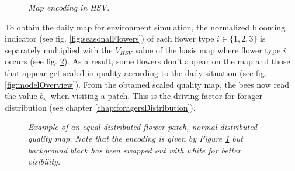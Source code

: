 	\begin{figure}[H]
		\centering
		\caption{\textit{Map encoding in HSV.}}
		\label{fig:hsvEncoding}
	\end{figure}
	
	To obtain the daily map for environment simulation, the normalized blooming indicator (see fig. \ref{fig:seasonalFlowers}) of each flower type $i \in \{1,2,3\}$ is separately multiplied with the $V_{HSV}$ value of the basis map where flower type $i$ occurs (see fig. \ref{fig:normeqMap}). As a result, some flowers don't appear on the map and those that appear get scaled in quality according to the daily situation (see fig. \ref{fig:modelOverview}). From the obtained scaled quality map, the bees now read the value $b_w$ when visiting a patch. This is the driving factor for forager distribution (see chapter \ref{chap:foragersDistribution}).
	
	\begin{figure}[H]
		\centering
		\caption{\textit{Example of an equal distributed flower patch, normal distributed quality map. Note that the encoding is given by Figure \ref{fig:hsvEncoding} but background black has been swapped out with white for better visibility.}}
		\label{fig:normeqMap}
	\end{figure}
	
